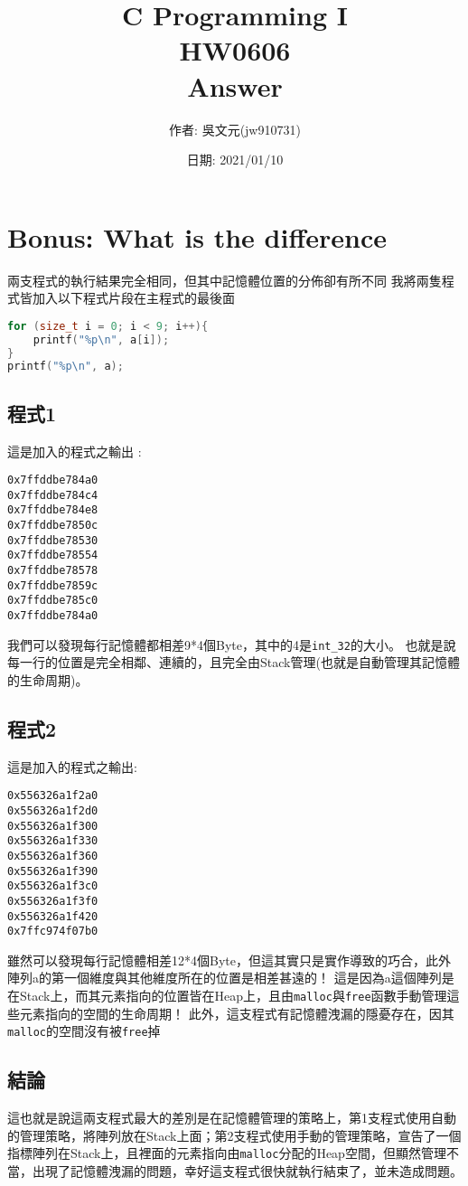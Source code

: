 \documentclass[a4paper,10pt]{article}
\title{C Programming I\\HW0606\\Answer}
\author{作者: 吳文元(jw910731)}
\date{日期: 2021/01/10}
\begin{document}
\maketitle
\section{Bonus: What is the difference}
兩支程式的執行結果完全相同，但其中記憶體位置的分佈卻有所不同
我將兩隻程式皆加入以下程式片段在主程式的最後面
\begin{lstlisting}[language=c]
for (size_t i = 0; i < 9; i++){
    printf("%p\n", a[i]);
}
printf("%p\n", a);
\end{lstlisting}
\subsection{程式1}
這是加入的程式之輸出 :
\begin{lstlisting}
0x7ffddbe784a0
0x7ffddbe784c4
0x7ffddbe784e8
0x7ffddbe7850c
0x7ffddbe78530
0x7ffddbe78554
0x7ffddbe78578
0x7ffddbe7859c
0x7ffddbe785c0
0x7ffddbe784a0
\end{lstlisting}
我們可以發現每行記憶體都相差9*4個Byte，其中的4是\lstinline{int_32}的大小。
也就是說每一行的位置是完全相鄰、連續的，且完全由Stack管理(也就是自動管理其記憶體的生命周期)。
\subsection{程式2}
這是加入的程式之輸出:
\begin{lstlisting}
0x556326a1f2a0
0x556326a1f2d0
0x556326a1f300
0x556326a1f330
0x556326a1f360
0x556326a1f390
0x556326a1f3c0
0x556326a1f3f0
0x556326a1f420
0x7ffc974f07b0
\end{lstlisting}
雖然可以發現每行記憶體相差12*4個Byte，但這其實只是實作導致的巧合，此外陣列a的第一個維度與其他維度所在的位置是相差甚遠的！
這是因為a這個陣列是在Stack上，而其元素指向的位置皆在Heap上，且由\lstinline{malloc}與\lstinline{free}函數手動管理這些元素指向的空間的生命周期！
此外，這支程式有記憶體洩漏的隱憂存在，因其\lstinline{malloc}的空間沒有被\lstinline{free}掉
\subsection{結論}
這也就是說這兩支程式最大的差別是在記憶體管理的策略上，第1支程式使用自動的管理策略，將陣列放在Stack上面；第2支程式使用手動的管理策略，宣告了一個指標陣列在Stack上，且裡面的元素指向由\lstinline{malloc}分配的Heap空間，但顯然管理不當，出現了記憶體洩漏的問題，幸好這支程式很快就執行結束了，並未造成問題。
\end{document}
